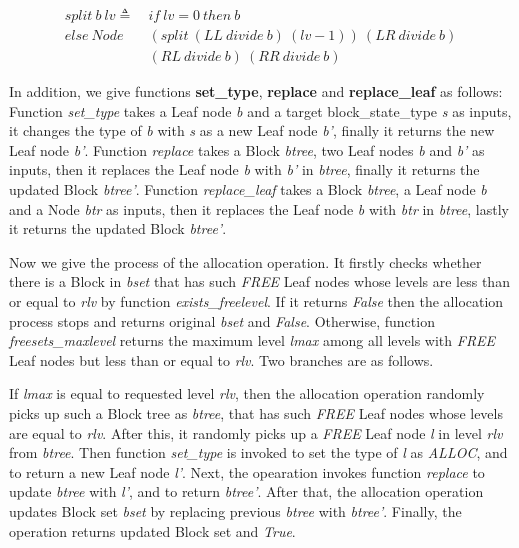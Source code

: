 \begin{definition} 
\end{definition}
\vspace{-7pt}
{\footnotesize
\begin{align*}
split\ b\ lv \triangleq\ &if\ lv = 0\ then\ b \\
else\ Node\ &(split\ (LL\ divide\ b)\ (lv - 1))\ (LR\ divide\ b)\\ 
&(RL\ divide\ b)\ (RR\ divide\ b)
\end{align*}
}	
\vspace{-12pt}

In addition, we give functions \textbf{set\_type}, \textbf{replace} and \textbf{replace\_leaf} as follows: Function \emph{set\_type} takes a Leaf node \emph{b} and a target block\_state\_type \emph{s} as inputs, it changes the type of \emph{b} with \emph{s} as a new Leaf node \emph{b'}, finally it returns the new Leaf node \emph{b'}. Function \emph{replace} takes a Block \emph{btree}, two Leaf nodes \emph{b} and \emph{b'} as inputs, then it replaces the Leaf node \emph{b} with \emph{b'} in \emph{btree}, finally it returns the updated Block \emph{btree'}. Function \emph{replace\_leaf} takes a Block \emph{btree}, a Leaf node \emph{b} and a Node \emph{btr} as inputs, then it replaces the Leaf node \emph{b} with \emph{btr} in \emph{btree}, lastly it returns the updated Block \emph{btree'}.

Now we give the process of the allocation operation. It firstly checks whether there is a Block in \emph{bset} that has such \emph{FREE} Leaf nodes whose levels are less than or equal to \emph{rlv} by function \emph{exists\_freelevel}. If it returns \emph{False} then the allocation process stops and returns original \emph{bset} and \emph{False}. Otherwise, function \emph{freesets\_maxlevel} returns the maximum level \emph{lmax} among all levels with \emph{FREE} Leaf nodes but less than or equal to \emph{rlv}. Two branches are as follows.

If \emph{lmax} is equal to requested level \emph{rlv}, then the allocation operation randomly picks up such a Block tree as \emph{btree}, that has such \emph{FREE} Leaf nodes whose levels are equal to \emph{rlv}. After this, it randomly picks up a \emph{FREE} Leaf node \emph{l} in level \emph{rlv} from \emph{btree}. Then function \emph{set\_type} is invoked to set the type of \emph{l} as \emph{ALLOC}, and to return a new Leaf node \emph{l'}. Next, the opearation invokes function \emph{replace} to update \emph{btree} with \emph{l'}, and to return \emph{btree'}. After that, the allocation operation updates Block set \emph{bset} by replacing previous \emph{btree} with \emph{btree'}. Finally, the operation returns updated Block set and \emph{True}.

